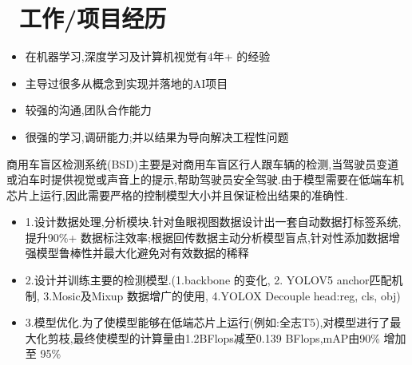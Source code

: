 \documentclass{resume}
\begin{document}


 


\section{\faUsers\ 工作/项目经历}
\role{AI研发部经理}

\begin{itemize}
  \item 在机器学习,深度学习及计算机视觉有4年+ 的经验
  \item 主导过很多从概念到实现并落地的AI项目
  \item 较强的沟通,团队合作能力
  \item 很强的学习,调研能力;并以结果为导向解决工程性问题
\end{itemize}

\begin{onehalfspacing}
商用车盲区检测系统(BSD)主要是对商用车盲区行人跟车辆的检测,当驾驶员变道或泊车时提供视觉或声音上的提示,帮助驾驶员安全驾驶.由于模型需要在低端车机芯片上运行,因此需要严格的控制模型大小并且保证检出结果的准确性.

\begin{itemize}
  \item 1.设计数据处理,分析模块.针对鱼眼视图数据设计出一套自动数据打标签系统,提升90\%+ 数据标注效率;根据回传数据主动分析模型盲点,针对性添加数据增强模型鲁棒性并最大化避免对有效数据的稀释
  \item 2.设计并训练主要的检测模型.(1.backbone 的变化, 2. YOLOV5 anchor匹配机制, 3.Mosic及Mixup 数据增广的使用, 4.YOLOX Decouple head:reg, cls, obj)
  \item 3.模型优化.为了使模型能够在低端芯片上运行(例如:全志T5),对模型进行了最大化剪枝,最终使模型的计算量由1.2BFlops减至0.139 BFlops,mAP由90\% 增加至 95\%
\end{itemize}
\end{onehalfspacing}
\end{document}
